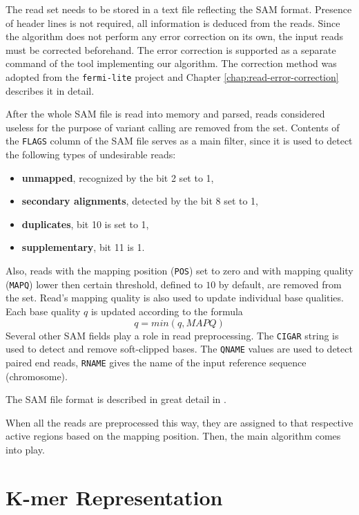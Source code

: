 The read set needs to be stored in a text file reflecting the SAM format. Presence of header lines is not required, all information is deduced from the reads. Since the algorithm does not perform any error correction on its own, the input reads must be corrected beforehand. The error correction is supported as a separate command of the tool implementing our algorithm. The correction method was adopted from the \texttt{fermi-lite}\cite{fermi-lite} project and Chapter \ref{chap:read-error-correction} describes it in detail.

After the whole SAM file is read into memory and parsed, reads considered useless for the purpose of variant calling are removed from the set. Contents of the \texttt{FLAGS} column of the SAM file serves as a main filter, since it is used to detect the following types of undesirable reads:
\begin{itemize}
\item \textbf{unmapped}, recognized by the bit 2 set to 1,
\item \textbf{secondary alignments}, detected by the bit 8 set to 1,
\item \textbf{duplicates}, bit 10 is set to 1,
\item \textbf{supplementary}, bit 11 is 1.
\end{itemize}

Also, reads with the mapping position (\texttt{POS}) set to zero and with mapping quality (\texttt{MAPQ}) lower then certain threshold, defined to $10$ by default, are removed from the set. Read's mapping quality is also used to update individual base qualities. Each base quality $q$ is updated according to the formula
$$
q = min(q, MAPQ)
$$
Several other SAM fields play a role in read preprocessing. The \texttt{CIGAR} string is used to detect and remove soft-clipped bases. The \texttt{QNAME} values are used to detect paired end reads, \texttt{RNAME} gives the name of the input reference sequence (chromosome).

The SAM file format is described in great detail in \cite{sambam}.

When all the reads are preprocessed this way, they are assigned to that respective active regions based on the mapping position. Then, the main algorithm comes into play.

\section{K-mer Representation}
\label{sec:kmer-representation}

